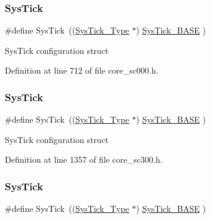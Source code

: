 \mbox{\label{group___c_m_s_i_s__core__base_gacd96c53beeaff8f603fcda425eb295de}} 
\subsubsection{\texorpdfstring{Sys\+Tick}{SysTick}\hspace{0.1cm}{\footnotesize\ttfamily [3/7]}}
{\footnotesize\ttfamily \#define Sys\+Tick~((\hyperlink{struct_sys_tick___type}{Sys\+Tick\+\_\+\+Type}   $\ast$)     \hyperlink{group___c_m_s_i_s__core__base_ga58effaac0b93006b756d33209e814646}{Sys\+Tick\+\_\+\+B\+A\+SE}  )}

Sys\+Tick configuration struct 

Definition at line 712 of file core\+\_\+sc000.\+h.

\mbox{\label{group___c_m_s_i_s__core__base_gacd96c53beeaff8f603fcda425eb295de}} 
\subsubsection{\texorpdfstring{Sys\+Tick}{SysTick}\hspace{0.1cm}{\footnotesize\ttfamily [4/7]}}
{\footnotesize\ttfamily \#define Sys\+Tick~((\hyperlink{struct_sys_tick___type}{Sys\+Tick\+\_\+\+Type}   $\ast$)     \hyperlink{group___c_m_s_i_s__core__base_ga58effaac0b93006b756d33209e814646}{Sys\+Tick\+\_\+\+B\+A\+SE}  )}

Sys\+Tick configuration struct 

Definition at line 1357 of file core\+\_\+sc300.\+h.

\mbox{\label{group___c_m_s_i_s__core__base_gacd96c53beeaff8f603fcda425eb295de}} 
\subsubsection{\texorpdfstring{Sys\+Tick}{SysTick}\hspace{0.1cm}{\footnotesize\ttfamily [5/7]}}
{\footnotesize\ttfamily \#define Sys\+Tick~((\hyperlink{struct_sys_tick___type}{Sys\+Tick\+\_\+\+Type}   $\ast$)     \hyperlink{group___c_m_s_i_s__core__base_ga58effaac0b93006b756d33209e814646}{Sys\+Tick\+\_\+\+B\+A\+SE}  )}


